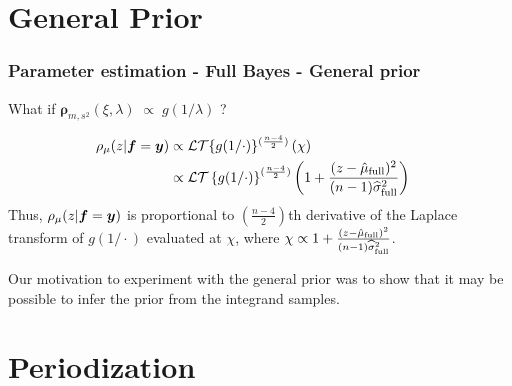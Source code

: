 \documentclass[handout, 10pt,compress,xcolor={usenames,dvipsnames}]{beamer} %
\newcommand{\bm}[1]{\boldsymbol{#1}}
\newcommand{\vrho}{\bm{\rho}}
\begin{document}
\appendix



\section{General Prior}



\begin{frame}
	\frametitle{Parameter estimation - Full Bayes - General prior}
	\vspace*{-6ex}
	What if $\vrho_{m,s^2}(\xi, \lambda) \; \propto \; g( 1/\lambda )$ ?
	
	\begin{align*}
	{\rho_{\mu}(z | \vf = \vy)} & \propto \mathcal{LT} \{ g(1/\cdot) \}^{(\frac{n-4}2)} \left(\chi \right) \\
	& \propto
	\mathcal{LT} \left\{ g({1}/{\cdot})
	\right\}^{(\frac{n-4}2)} \left( 1 +  \frac{(z - \hmu_{\textup{full}})^2}{(n-1)\widehat{\sigma}_{\textup{full}}^2}\right) \quad %
	\end{align*}
	Thus, $\rho_{\mu}(z | \boldsymbol{f} = \boldsymbol{y})$  is proportional to $\left(\frac{n-4}{2}\right)$th derivative of the Laplace transform of $g(1/\cdot)$ evaluated at $\chi$, where $\chi \propto { 1 +  \frac{(z - \hat{\mu}_{\textup{full}})^2}{(n-1)\widehat{\sigma}_{\textup{full}}^2} } $.
	
	Our motivation to experiment with the general prior was to show that it may
	be possible to infer the prior from the integrand samples.
\end{frame}






\section{Periodization}
\end{document}
